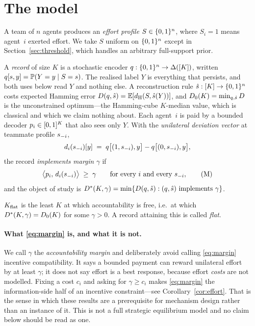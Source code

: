 \section{The model}
\label{sec:model}

A team of $n$ agents produces an \emph{effort profile} $S \in \{0,1\}^n$, where
$S_i = 1$ means agent~$i$ exerted effort. We take $S$ uniform on $\{0,1\}^n$ except
in Section~\ref{sec:threshold}, which handles an arbitrary full-support prior.

A \emph{record} of size $K$ is a stochastic encoder
$q : \{0,1\}^n \to \Delta([K])$, written
$q[s,y] = \mathbb{P}(Y = y \mid S = s)$. The realised label $Y$ is everything that
persists, and both uses below read $Y$ and nothing else. A reconstruction rule
$\hat{s} : [K] \to \{0,1\}^n$ costs expected Hamming error
$D(q,\hat{s}) = \mathbb{E}[d_{\mathrm{H}}(S, \hat{s}(Y))]$, and
$D_0(K) = \min_{q,\hat{s}} D$ is the unconstrained optimum---the Hamming-cube
$K$-median value, which is classical and which we claim nothing about. Each
agent~$i$ is paid by a bounded decoder $p_i \in [0,1]^K$ that also sees only
$Y$. With the \emph{unilateral deviation vector} at teammate profile $s_{-i}$,
\[
  d_i(s_{-i})[y] \;=\; q\bigl[(1,s_{-i}),y\bigr] - q\bigl[(0,s_{-i}),y\bigr],
\]
the record \emph{implements margin $\gamma$} if
\begin{equation}
  \bigl\langle p_i,\, d_i(s_{-i}) \bigr\rangle \;\ge\; \gamma
  \qquad \text{for every } i \text{ and every } s_{-i} ,
  \tag{M}\label{eq:margin}
\end{equation}
and the object of study is
$D^\ast(K,\gamma) = \min\{D(q,\hat{s}) : (q,\hat{s}) \text{ implements } \gamma\}$.

\begin{definition}
\label{def:kflat}
$K_{\mathrm{flat}}$ is the least $K$ at which accountability is free, i.e.\ at which
$D^\ast(K,\gamma) = D_0(K)$ for some $\gamma > 0$. A record attaining this is
called \emph{flat}.
\end{definition}

\paragraph{What \eqref{eq:margin} is, and what it is not.}
We call $\gamma$ the \emph{accountability margin} and deliberately avoid calling
\eqref{eq:margin} incentive compatibility. It says a bounded payment can reward
unilateral effort by at least $\gamma$; it does not say effort is a best
response, because effort \emph{costs} are not modelled. Fixing a cost $c_i$ and
asking for $\gamma \ge c_i$ makes \eqref{eq:margin} the information-side half of
an incentive constraint---see Corollary~\ref{cor:effort}. That is the sense in
which these results are a prerequisite for mechanism design rather than an
instance of it. This is not a full strategic equilibrium model and no claim below
should be read as one.

